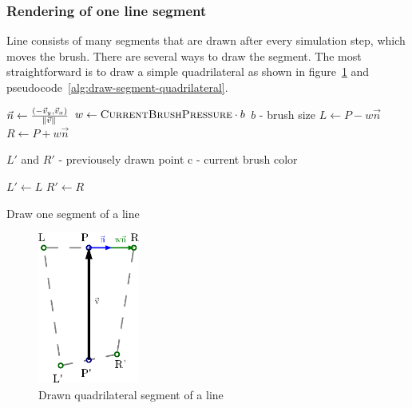 \subsubsection*{Rendering of one line segment}

Line consists of many segments that are drawn after every simulation step, which moves the brush. There are several ways to draw the segment. The most straightforward is to draw a simple quadrilateral as shown in figure~\ref{fig:draw-segment-quadrilateral} and pseudocode~\ref{alg:draw-segment-quadrilateral}.

\begin{pseudocode}
	\begin{algorithmic}
              \State $ \vec{n} \gets \frac{(-\vec{v}_y, \vec{v}_x)}{\norm{\vec{v}}} $        
              \State $ w \gets \Call{CurrentBrushPressure}{} \cdot b $ \Comment $b$ - brush size
              \State $L \gets P - w\vec{n}$
              \State $R \gets P + w\vec{n}$

              \State {}
              \State {} \Comment $L'$ and $R'$ - previousely drawn point
              \State {}
              \State {}
              \State {}
              \State {}
              \State {} \Comment c - current brush color

              \State $L' \gets L$
              \State $R' \gets R$
          \EndFunction
       \end{algorithmic}
  	   \caption{Draw one segment of a line}
      \label{alg:draw-segment-quadrilateral}
   \end{pseudocode}

   
  \begin{figure}
  	\centering
      \includegraphics[height=50mm]{../img/draw-segment-quadrilateral.eps}
      \caption{Drawn quadrilateral segment of a line}
      \label{fig:draw-segment-quadrilateral}
  \end{figure}


